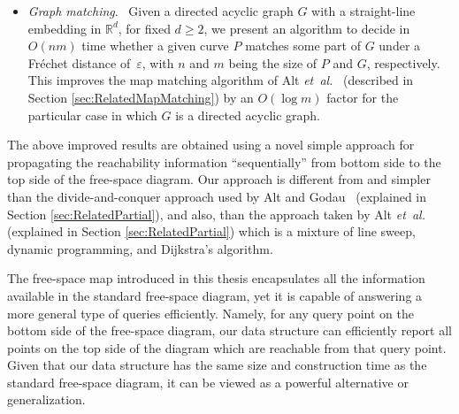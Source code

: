 \documentclass[12pt]{dalthesis}
\newcommand{\IR}{\ensuremath{\mathbb{R}}}
\newcommand{\gee}{\geqslant}
\newcommand{\eps}{\varepsilon}
\newcommand{\etal}{{\em et~al.\/}}
\newcommand{\REM}[1]{}
\newcommand{\Frechet}{Fr\'echet }
\newcommand{\fs}{free-space }
\begin{document}
\begin{itemize}
	\item \emph{Graph matching}. \ 
	Given a directed acyclic graph $G$ with a straight-line embedding in $\IR^d$,
	for fixed $d \gee 2$,
	we present an algorithm to decide in $O(nm)$ time whether
	a given curve $P$ matches some part of 
	$G$ under a \Frechet distance of~$\eps$, 
	with $n$ and $m$ being the size of $P$ and $G$, respectively.
	This improves the map matching algorithm of Alt \etal~\cite{AltERW03a}
	(described in Section \ref{sec:RelatedMapMatching})
	by an $O(\log m)$ factor for the particular case in which $G$ is a directed acyclic graph.
	 


\end{itemize}


\REM{
They also provided an
$O(n^2 \log^2 n)$ time algorithm to compute the \Frechet distance between two
closed curves. Since then, different variants of the \Frechet distance have
been studied in the literature which are all based on constructing
a data structure called free space diagram, introduced by Alt and Godau~\cite{AltG95}.
We present a data structure on top of the free space diagram
that besides its simplicity, allows us to compute the \Frechet distance between
two closed curves, $O(\log n)$ time faster than the algorithm by Alt and
Godau. In addition, our data structure can be employed in several
applications related to partial curve matching.
}

The above improved results are obtained using a novel simple approach for
propagating the reachability information ``sequentially'' 
from bottom side to the top side of the \fs diagram.
Our approach is different from and simpler than the 
divide-and-conquer approach used by Alt and Godau~\cite{AltG95}
(explained in Section \ref{sec:RelatedPartial}),
and also, than the approach taken by Alt \etal~\cite{AltERW03a}
(explained in Section \ref{sec:RelatedPartial}) which is
a mixture of line sweep, dynamic programming, and Dijkstra's algorithm.


The \fs map introduced in this thesis
encapsulates all the information available in the
standard \fs diagram, yet
it is capable of answering a more general type of queries efficiently.
Namely, for any query point on the bottom side of the \fs diagram, 
our data structure can efficiently report all points on the top side of the diagram 
which are reachable from that query point.
Given that our data structure has the same
size and construction time as the standard \fs diagram, 
it can be viewed as a powerful alternative 
or generalization. 
\end{document}
